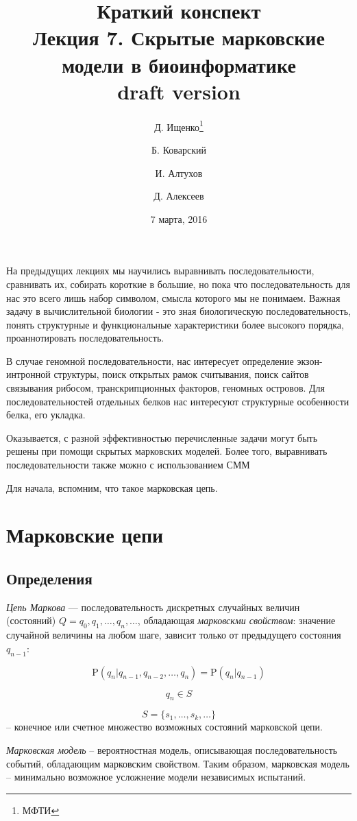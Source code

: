 \documentclass[letterpaper, 11pt]{article}
\title{\large{Краткий конспект}\\
\LARGE{Лекция 7. Скрытые марковские модели в биоинформатике}\\
draft version}
\date{7 марта, 2016}
\author{Д. Ищенко\thanks{МФТИ} \and Б. Коварский\footnotemark[1]
\and И. Алтухов\footnotemark[1] \and Д. Алексеев\footnotemark[1]}
\newcommand{\prob}{\mathrm{P}}
\begin{document}
\maketitle
\thispagestyle{empty}
\clearpage


На предыдущих лекциях мы научились выравнивать последовательности, сравнивать их, собирать короткие в большие, но пока что последовательность для нас это всего лишь набор символом, смысла которого мы не понимаем.
Важная задачу в вычислительной биологии - это зная биологическую последовательность, понять структурные и функциональные характеристики более высокого порядка, проаннотировать последовательность.

В случае геномной последовательности, нас интересует определение экзон-интронной структуры, поиск открытых рамок считывания, поиск 	сайтов связывания рибосом, транскрипционных факторов, геномных островов. Для последовательностей отдельных белков нас интересуют структурные особенности белка, его укладка.

Оказывается, с разной эффективностью перечисленные задачи могут быть решены при помощи скрытых марковских моделей. Более того, выравнивать последовательности также можно с использованием СММ

Для начала, вспомним, что такое марковская цепь.

\section{Марковские цепи}
\subsection{Определения}

\textit{Цепь Маркова} — последовательность дискретных случайных величин (состояний) $Q=q_0,q_1,\ldots,q_n,\ldots$, обладающая \textit{марковскми свойством}: значение случайной величины на любом шаге, зависит только от предыдущего состояния $q_{n-1}$:

$$\prob(q_{n}|q_{n-1},q_{n-2},\ldots,q_{n})=\prob(q_{n}|q_{n-1})$$

$$q_{n}\in S$$

$$S=\{s_1,\ldots,s_k,\ldots\}$$ -- конечное или счетное множество возможных состояний марковской цепи.


\textit{Марковская модель} -- вероятностная модель, описывающая последовательность событий, обладающим марковским свойством.
Таким образом, марковская модель -- минимально возможное усложнение модели независимых испытаний.
\end{document}

